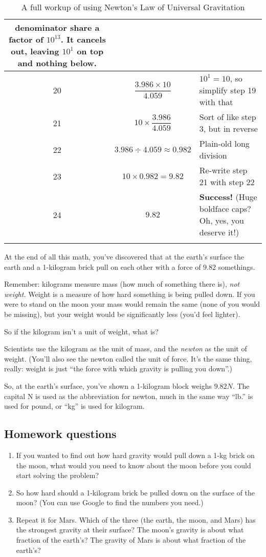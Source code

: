 \documentclass[10pt,letterpaper]{report}
\begin{document}
\begin{longtable}{| c | p{} | p{} |}
  denominator share a factor of $10^{13}$.  It cancels out, leaving
  $10^1$ on top and nothing below. \\
  \hline
  20 & \[\frac{3.986 \times 10}{4.059}\] & $10^1 = 10$, so simplify
  step 19 with that \\
  \hline
  21 & \[10 \times \frac{3.986}{4.059}\] & Sort of like step 3, but in
  reverse \\
  \hline
  22 & \[3.986 \div 4.059 \approx 0.982\] & Plain-old long division \\
  \hline
  23 & \[10 \times 0.982 = 9.82 \] & Re-write step 21 with step 22 \\
  \hline
  24 & \[9.82\] & {\Huge{\textbf{Success!}}} (Huge boldface caps?  Oh, yes,
  you deserve it!) \\
  \hline   
\caption{A full workup of using Newton's Law of Universal Gravitation}  
\end{longtable}

At the end of all this math, you've discovered that at the earth's
surface the earth and a 1-kilogram brick pull on each other with a
force of $9.82$ somethings.

Remember: kilograms measure mass (how much of something there is),
\textit{not weight.}  Weight is a measure of how hard something is
being pulled down.  If you were to stand on the moon your mass would
remain the same (none of you would be missing), but your weight would
be significantly less (you'd feel lighter).

So if the kilogram isn't a unit of weight, what is?

Scientists use the kilogram as the unit of mass, and the
\textit{newton} as the unit of weight.  (You'll also see the newton
called the unit of force.  It's the same thing, really: weight is just
``the force with which gravity is pulling you down''.)

So, at the earth's surface, you've shown a 1-kilogram block weighs
$9.82N$.  The capital N is used as the abbreviation for newton, much
in the same way ``lb.'' is used for pound, or ``kg'' is used for kilogram.

\subsection{Homework questions}
\begin{enumerate}
\item
If you wanted to find out how hard gravity would pull down a 1-kg brick on
the moon, what would you need to know about the moon before you could start
solving the problem?
\item
So how hard should a 1-kilogram brick be pulled down on the surface of
the moon?  (You can use Google to find the numbers you need.)
\item
Repeat it for Mars.  Which of the three (the earth, the moon, and Mars) has the
strongest gravity at their surface?  The moon's gravity is about what
fraction of the earth's?  The gravity of Mars is about what fraction of
the earth's?
\end{enumerate}
\end{document}
